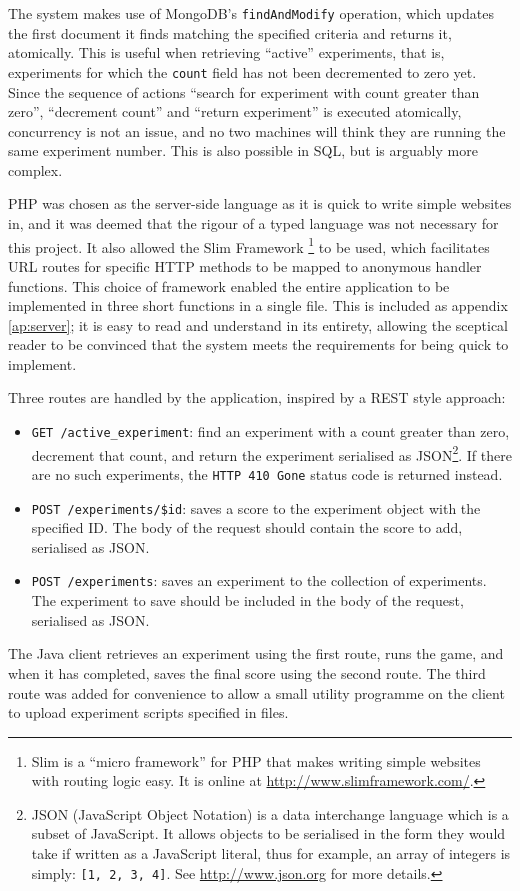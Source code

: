 
The system makes use of MongoDB's {\tt findAndModify} operation, which updates the first document it finds matching the specified criteria and returns it, atomically.  This is useful when retrieving ``active'' experiments, that is, experiments for which the {\tt count} field has not been decremented to zero yet.  Since the sequence of actions ``search for experiment with count greater than zero'', ``decrement count'' and ``return experiment'' is executed atomically, concurrency is not an issue, and no two machines will think they are running the same experiment number.  This is also possible in SQL, but is arguably more complex.

PHP was chosen as the server-side language as it is quick to write simple websites in, and it was deemed that the rigour of a typed language was not necessary for this project.  It also allowed the Slim Framework \footnote{Slim is a ``micro framework'' for PHP that makes writing simple websites with routing logic easy.  It is online at \url{http://www.slimframework.com/}.} to be used, which facilitates URL routes for specific HTTP methods to be mapped to anonymous handler functions.  This choice of framework enabled the entire application to be implemented in three short functions in a single file.  This is included as appendix \ref{ap:server}; it is easy to read and understand in its entirety, allowing the sceptical reader to be convinced that the system meets the requirements for being quick to implement.

Three routes are handled by the application, inspired by a REST style approach:

\begin{itemize}
\item {\tt GET /active\_experiment}: find an experiment with a count greater than zero, decrement that count, and return the experiment serialised as JSON\footnote{JSON (JavaScript Object Notation) is a data interchange language which is a subset of JavaScript.  It allows objects to be serialised in the form they would take if written as a JavaScript literal, thus for example, an array of integers is simply: {\tt [1, 2, 3, 4]}.  See \url{http://www.json.org} for more details.}.  If there are no such experiments, the {\tt HTTP 410 Gone} status code is returned instead.
\item {\tt POST /experiments/\$id}: saves a score to the experiment object with the specified ID.  The body of the request should contain the score to add, serialised as JSON.
\item {\tt POST /experiments}: saves an experiment to the collection of experiments.  The experiment to save should be included in the body of the request, serialised as JSON.
\end{itemize}

The Java client retrieves an experiment using the first route, runs the game, and when it has completed, saves the final score using the second route.  The third route was added for convenience to allow a small utility programme on the client to upload experiment scripts specified in files.



